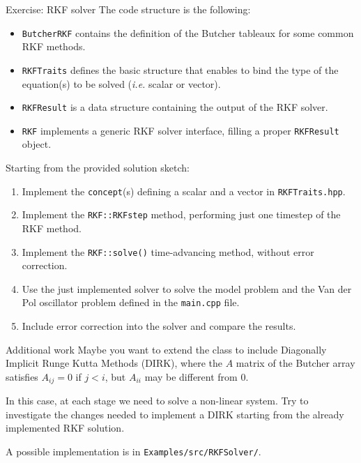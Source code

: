 \documentclass[10pt,aspectratio=169]{beamer}
\begin{document}
\begin{frame}{Exercise: RKF solver}
The code structure is the following:
\begin{itemize}
\item \texttt{ButcherRKF} contains the definition of the Butcher tableaux for some common RKF methods.
\item \texttt{RKFTraits} defines the basic structure that enables to bind the type of the equation(s) to be solved (\textit{i.e.} scalar or vector).
\item \texttt{RKFResult} is a data structure containing the output of the RKF solver.
\item \texttt{RKF} implements a generic RKF solver interface, filling a proper \texttt{RKFResult} object.
\end{itemize}
\vfill
Starting from the provided solution sketch:
\begin{enumerate}
\item Implement the \texttt{concept}(s) defining a scalar and a vector in \texttt{RKFTraits.hpp}.
\item Implement the \texttt{RKF::RKFstep} method, performing just one timestep of the RKF method.
\item Implement the \texttt{RKF::solve()} time-advancing method, without error correction.
\item Use the just implemented solver to solve the model problem and the Van der Pol oscillator problem defined in the \texttt{main.cpp} file.
\item Include error correction into the solver and compare the results.
\end{enumerate}
\end{frame}

\begin{frame}{Additional work}
  Maybe you want to extend the class to include Diagonally Implicit Runge Kutta Methods
  (DIRK), where the $A$ matrix of the Butcher array satisfies $A_{ij}=0$ if $j<i$, but
  $A_{ii}$ may be different from $0$.
  \smallskip
  
  In this case, at each stage we need to solve a non-linear system. Try to investigate the changes needed to implement a DIRK starting from the already implemented RKF solution.
  \smallskip
  
  A possible implementation is in \texttt{Examples/src/RKFSolver/}.
\end{frame}
\end{document}
